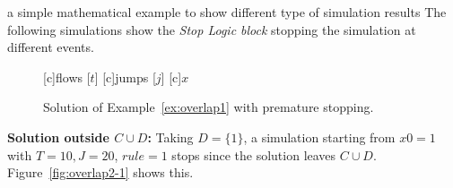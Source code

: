 \begin{example}{a simple mathematical example to show different type of simulation results}
The following simulations show the {\em Stop Logic block} stopping
the simulation at different events.
\begin{figure}[ht]
  \centering
  [c]{flows [$t$]}
  [c]{jumps [$j$]}
  [c]{$x$}
\qquad
{}
\caption{Solution of Example~\ref{ex:overlap1} with premature stopping.}
\end{figure}
%

{\bf Solution outside $C\cup D$:}
Taking $D = \{1\}$, a simulation starting from $x0=1$ with $T=10,J=20$, $rule = 1$ stops since the solution leaves $C\cup D$. Figure~\ref{fig:overlap2-1} shows this.


\end{example}
